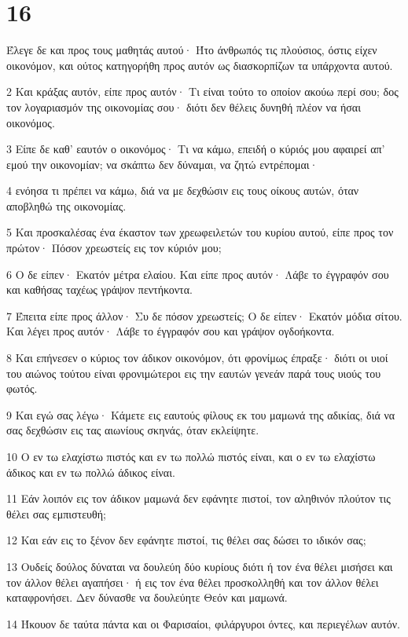 \chapter{16}

\par Έλεγε δε και προς τους μαθητάς αυτού· Ήτο άνθρωπός τις πλούσιος, όστις είχεν οικονόμον, και ούτος κατηγορήθη προς αυτόν ως διασκορπίζων τα υπάρχοντα αυτού.
\par 2 Και κράξας αυτόν, είπε προς αυτόν· Τι είναι τούτο το οποίον ακούω περί σου; δος τον λογαριασμόν της οικονομίας σου· διότι δεν θέλεις δυνηθή πλέον να ήσαι οικονόμος.
\par 3 Είπε δε καθ' εαυτόν ο οικονόμος· Τι να κάμω, επειδή ο κύριός μου αφαιρεί απ' εμού την οικονομίαν; να σκάπτω δεν δύναμαι, να ζητώ εντρέπομαι·
\par 4 ενόησα τι πρέπει να κάμω, διά να με δεχθώσιν εις τους οίκους αυτών, όταν αποβληθώ της οικονομίας.
\par 5 Και προσκαλέσας ένα έκαστον των χρεωφειλετών του κυρίου αυτού, είπε προς τον πρώτον· Πόσον χρεωστείς εις τον κύριόν μου;
\par 6 Ο δε είπεν· Εκατόν μέτρα ελαίου. Και είπε προς αυτόν· Λάβε το έγγραφόν σου και καθήσας ταχέως γράψον πεντήκοντα.
\par 7 Έπειτα είπε προς άλλον· Συ δε πόσον χρεωστείς; Ο δε είπεν· Εκατόν μόδια σίτου. Και λέγει προς αυτόν· Λάβε το έγγραφόν σου και γράψον ογδοήκοντα.
\par 8 Και επήνεσεν ο κύριος τον άδικον οικονόμον, ότι φρονίμως έπραξε· διότι οι υιοί του αιώνος τούτου είναι φρονιμώτεροι εις την εαυτών γενεάν παρά τους υιούς του φωτός.
\par 9 Και εγώ σας λέγω· Κάμετε εις εαυτούς φίλους εκ του μαμωνά της αδικίας, διά να σας δεχθώσιν εις τας αιωνίους σκηνάς, όταν εκλείψητε.
\par 10 Ο εν τω ελαχίστω πιστός και εν τω πολλώ πιστός είναι, και ο εν τω ελαχίστω άδικος και εν τω πολλώ άδικος είναι.
\par 11 Εάν λοιπόν εις τον άδικον μαμωνά δεν εφάνητε πιστοί, τον αληθινόν πλούτον τις θέλει σας εμπιστευθή;
\par 12 Και εάν εις το ξένον δεν εφάνητε πιστοί, τις θέλει σας δώσει το ιδικόν σας;
\par 13 Ουδείς δούλος δύναται να δουλεύη δύο κυρίους διότι ή τον ένα θέλει μισήσει και τον άλλον θέλει αγαπήσει· ή εις τον ένα θέλει προσκολληθή και τον άλλον θέλει καταφρονήσει. Δεν δύνασθε να δουλεύητε Θεόν και μαμωνά.
\par 14 Ήκουον δε ταύτα πάντα και οι Φαρισαίοι, φιλάργυροι όντες, και περιεγέλων αυτόν.
